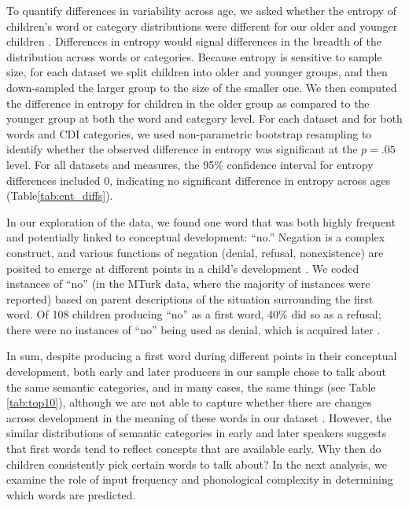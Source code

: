 \documentclass[10pt,letterpaper]{article}
\begin{document}
To quantify differences in variability across age, we asked whether the entropy of children's word or category distributions were different for our older and younger children \cite{shannon1948}. Differences in entropy would signal differences in the breadth of the distribution across words or categories. Because entropy is sensitive to sample size, for each dataset we split children into older and younger groups, and then down-sampled the larger group to the size of the smaller one. We then computed the difference in entropy for children in the older group as compared to the younger group at both the word and category level. For each dataset and for both words and CDI categories, we used non-parametric bootstrap resampling to identify whether the observed difference in entropy was significant at the $p = .05$ level. For all datasets and measures, the 95\% confidence interval for entropy differences included 0, indicating no significant difference in entropy across ages (Table\ref{tab:ent_diffs}).

In our exploration of the data, we found one word that was both highly frequent and potentially linked to conceptual development: ``no.'' Negation is a complex construct, and various functions of negation (denial, refusal, nonexistence) are posited to emerge at different points in a child's development \cite{pea1982}. We coded instances of ``no'' (in the MTurk data, where the majority of instances were reported) based on parent descriptions of the situation surrounding the first word. Of 108 children producing ``no'' as a first word, 40\% did so as a refusal; there were no instances of ``no'' being used as denial, which is acquired later \cite{pea1982}. 

In sum, despite producing a first word during different points in their conceptual development, both early and later producers in our sample chose to talk about the same semantic categories, and in many cases, the same things (see Table \ref{tab:top10}), although we are not able to capture whether there are changes across development in the meaning of these words in our dataset \cite{bates1976}. However, the similar distributions of semantic categories in early and later speakers suggests that first words tend to reflect concepts that are available early. Why then do children consistently pick certain words to talk about? In the next analysis, we examine the role of input frequency and phonological complexity in determining which words are predicted. 

\vspace{-.2em}
\end{document}
